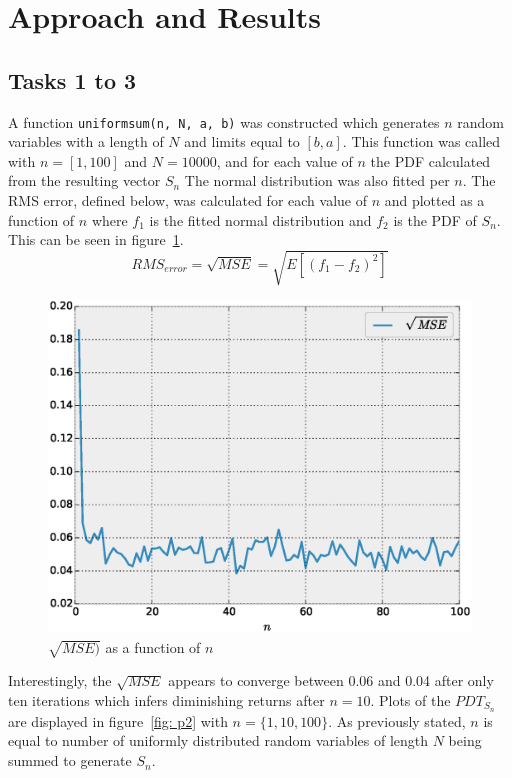 \section{Approach and Results} 

\subsection{Tasks 1 to 3} 
A function \verb|uniformsum(n, N, a, b)| was constructed which generates $n$ random variables with a length of $N$ and limits equal to $[b,a]$. This function was called with $n=[1, 100]$ and $N = 10000$,  and for each value of $n$ the PDF calculated from the resulting vector $S_n$ The normal distribution was also fitted per $n$. The RMS error, defined below, was calculated for each value of $n$ and plotted as a function of $n$ where $f_1$ is the fitted normal distribution and $f_2$ is the PDF of $S_n$. This can be seen in figure~\ref{fig: p1}. 
\begin{equation}
RMS_{error} = \sqrt{MSE} = \sqrt{E[(f_1 - f_2)^2]}
\end{equation}
 
\begin{figure}[H] 
	\centering 
	\includegraphics[width=\linewidth]{figure_1}
	\caption{$\sqrt{MSE)}$ as a function of $n$}
	\label{fig: p1} 
\end{figure}

Interestingly, the $\sqrt{MSE}$ appears to converge between 0.06 and 0.04 after only ten iterations which infers diminishing returns after $n = 10$. Plots of the $PDT_{S_n}$ are displayed in figure~\ref{fig: p2} with $n = \{1, 10, 100\}$. As previously stated,  $n$ is equal to number of  uniformly distributed random variables of length $N$ being summed to generate $S_n$. \\

